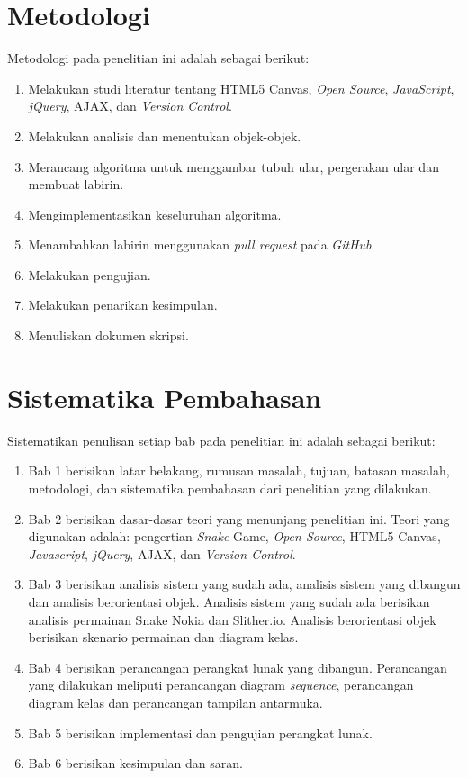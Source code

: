\section{Metodologi}
\label{sec:metlit}
Metodologi pada penelitian ini adalah sebagai berikut:
\begin{enumerate}
	\item Melakukan studi literatur tentang HTML5 Canvas, \textit{Open Source}, \textit{JavaScript}, \textit{jQuery}, AJAX, dan \textit{Version Control}.
	\item Melakukan analisis dan menentukan objek-objek.
	\item Merancang algoritma untuk menggambar tubuh ular, pergerakan ular dan membuat labirin.
	\item Mengimplementasikan keseluruhan algoritma.
	\item Menambahkan labirin menggunakan \textit{pull request} pada \textit{GitHub}.
	\item Melakukan pengujian.
	\item Melakukan penarikan kesimpulan. 
	\item Menuliskan dokumen skripsi.
\end{enumerate}


\section{Sistematika Pembahasan}
\label{sec:sispem}
Sistematikan penulisan setiap bab pada penelitian ini adalah sebagai berikut:
\begin{enumerate}
	\item Bab 1 berisikan latar belakang, rumusan masalah, tujuan, batasan masalah, metodologi, dan sistematika pembahasan dari penelitian yang dilakukan.
	\item Bab 2 berisikan dasar-dasar teori yang menunjang penelitian ini. Teori yang digunakan adalah: pengertian \textit{Snake} Game, \textit{Open Source}, HTML5 Canvas, \textit{Javascript}, \textit{jQuery}, AJAX, dan \textit{Version Control}.
	\item Bab 3 berisikan analisis sistem yang sudah ada, analisis sistem yang dibangun dan analisis berorientasi objek. Analisis sistem yang sudah ada berisikan analisis permainan Snake Nokia dan Slither.io. Analisis berorientasi objek berisikan skenario permainan dan diagram kelas. 
	\item Bab 4 berisikan perancangan perangkat lunak yang dibangun. Perancangan yang dilakukan meliputi perancangan diagram \textit{sequence}, perancangan diagram kelas dan perancangan tampilan antarmuka.
	\item Bab 5 berisikan implementasi dan pengujian perangkat lunak.
	\item Bab 6 berisikan kesimpulan dan saran.
\end{enumerate}